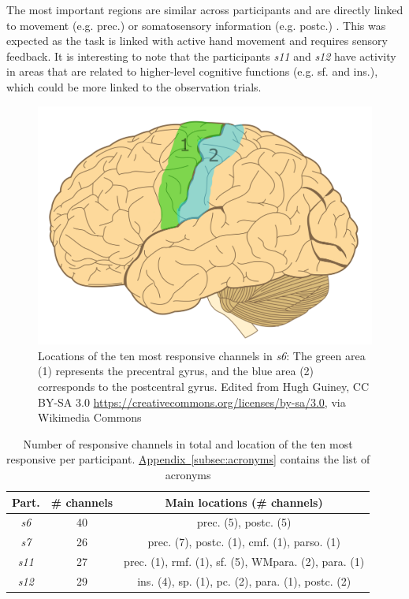 \documentclass[10pt,conference,compsocconf]{IEEEtran}
\newcommand{\aref}[1]{\hyperref[#1]{Appendix~\ref*{#1}}}
\begin{document}
The most important regions are similar across participants and are directly linked to movement (e.g. prec.) \cite{precentral_gyrus} or somatosensory information (e.g. postc.) \cite{postcentral_gyrus}. This was expected as the task is linked with active hand movement and requires sensory feedback. It is interesting to note that the participants \textit{s11} and \textit{s12} have activity in areas that are related to higher-level cognitive functions (e.g. sf. and ins.), which could be more linked to the observation trials.

\vspace{-1em}
\begin{figure}[h!]
    \center
    \includegraphics[width=0.7\linewidth]{images/Human-brain.png}
    \caption{Locations of the ten most responsive channels in \textit{s6}: The green area (1) represents the precentral gyrus, and the blue area (2) corresponds to the postcentral gyrus. Edited from Hugh Guiney, CC BY-SA 3.0 \url{https://creativecommons.org/licenses/by-sa/3.0}, via Wikimedia Commons}
    \label{fig:s6actionrecogchannels}
\end{figure}
\FloatBarrier

\vspace{-1em}
\begin{table}[h!]
    \centering
    \begin{tabular}{| c | c | c |}
        \hline
        Part. & \# channels & Main locations (\# channels) \\
        \hline
        \textit{s6} & 40 & prec. (5), postc. (5) \\
        \hline
        \textit{s7} & 26 & prec. (7), postc. (1), cmf. (1), parso. (1) \\
        \hline
        \textit{s11} & 27 & prec. (1),  rmf. (1), sf. (5), WMpara. (2), para. (1) \\
        \hline
        \textit{s12} & 29 & ins. (4), sp. (1), pc. (2), para. (1), postc. (2) \\
        \hline
    \end{tabular}
    \caption{Number of responsive channels in total and location of the ten most responsive per participant. \aref{subsec:acronyms} contains the list of acronyms}
    \label{tab:actionrecogchannellocations}
\end{table}
\end{document}
